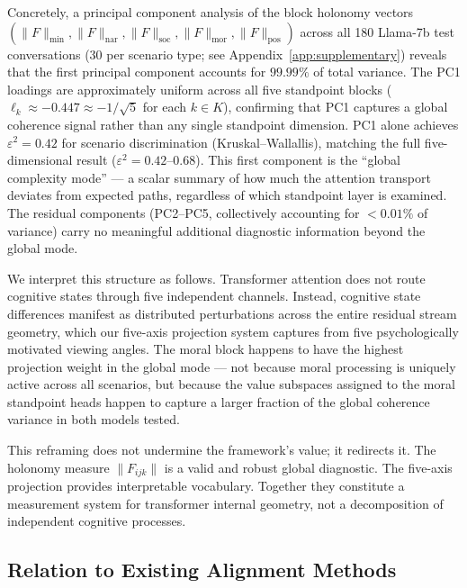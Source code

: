 Concretely, a principal component analysis of the block holonomy vectors
$(\|F\|_{\min}, \|F\|_{\mathrm{nar}}, \|F\|_{\mathrm{soc}}, \|F\|_{\mathrm{mor}},
\|F\|_{\mathrm{pos}})$ across all 180 Llama-7b test conversations (30 per scenario type;
see Appendix~\ref{app:supplementary}) reveals that the first
principal component accounts for $99.99\%$ of total variance. The PC1 loadings are
approximately uniform across all five standpoint blocks ($\ell_k \approx -0.447 \approx
-1/\sqrt{5}$ for each $k \in K$), confirming that PC1 captures a global coherence signal
rather than any single standpoint dimension. PC1 alone achieves $\varepsilon^2 = 0.42$
for scenario discrimination (Kruskal--Wallallis), matching the full five-dimensional
result ($\varepsilon^2 = 0.42$--$0.68$). This first component is the ``global
complexity mode'' --- a scalar summary of how much the attention transport deviates from
expected paths, regardless of which standpoint layer is examined. The residual components
(PC2--PC5, collectively accounting for $< 0.01\%$ of variance) carry no meaningful
additional diagnostic information beyond the global mode.

We interpret this structure as follows. Transformer attention does not route cognitive
states through five independent channels. Instead, cognitive state differences manifest as
distributed perturbations across the entire residual stream geometry, which our five-axis
projection system captures from five psychologically motivated viewing angles. The moral
block happens to have the highest projection weight in the global mode --- not because
moral processing is uniquely active across all scenarios, but because the value subspaces
assigned to the moral standpoint heads happen to capture a larger fraction of the global
coherence variance in both models tested.

This reframing does not undermine the framework's value; it redirects it. The holonomy
measure $\|F_{ijk}\|$ is a valid and robust global diagnostic. The five-axis projection
provides interpretable vocabulary. Together they constitute a measurement system for
transformer internal geometry, not a decomposition of independent cognitive processes.

\subsection{Relation to Existing Alignment Methods}

